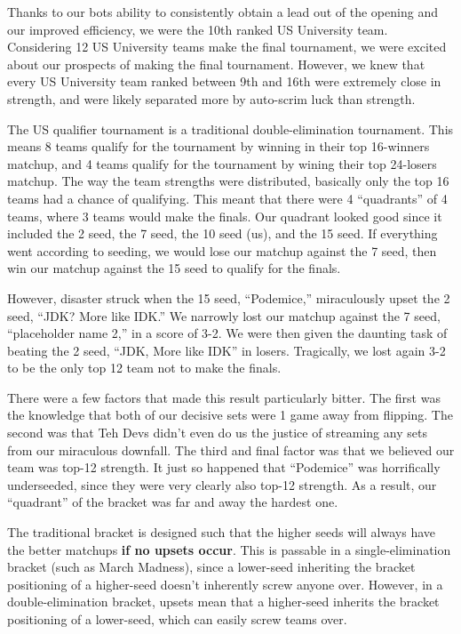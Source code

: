 Thanks to our bots ability to consistently obtain a lead out of the opening and our improved efficiency, we were the 10th ranked US University team. Considering 12 US University teams make the final tournament, we were excited about our prospects of making the final tournament. However, we knew that every US University team ranked between 9th and 16th were extremely close in strength, and were likely separated more by auto-scrim luck than strength.

\medskip

The US qualifier tournament is a traditional double-elimination tournament. This means 8 teams qualify for the tournament by winning in their top 16-winners matchup, and 4 teams qualify for the tournament by wining their top 24-losers matchup. The way the team strengths were distributed, basically only the top 16 teams had a chance of qualifying. This meant that there were 4 ``quadrants'' of 4 teams, where 3 teams would make the finals. Our quadrant looked good since it included the 2 seed, the 7 seed, the 10 seed (us), and the 15 seed. If everything went according to seeding, we would lose our matchup against the 7 seed, then win our matchup against the 15 seed to qualify for the finals.

\medskip

However, disaster struck when the 15 seed, ``Podemice,'' miraculously upset the 2 seed, ``JDK? More like IDK.'' We narrowly lost our matchup against the 7 seed, ``placeholder name 2,'' in a score of 3-2. We were then given the daunting task of beating the 2 seed, ``JDK, More like IDK'' in losers. Tragically, we lost again 3-2 to be the only top 12 team not to make the finals.

\medskip

There were a few factors that made this result particularly bitter. The first was the knowledge that both of our decisive sets were 1 game away from flipping. The second was that Teh Devs didn't even do us the justice of streaming any sets from our miraculous downfall. The third and final factor was that we believed our team was top-12 strength. It just so happened that ``Podemice'' was horrifically underseeded, since they were very clearly also top-12 strength. As a result, our ``quadrant'' of the bracket was far and away the hardest one.

\medskip

The traditional bracket is designed such that the higher seeds will always have the better matchups \textbf{if no upsets occur}. This is passable in a single-elimination bracket (such as March Madness), since a lower-seed inheriting the bracket positioning of a higher-seed doesn't inherently screw anyone over. However, in a double-elimination bracket, upsets mean that a higher-seed inherits the bracket positioning of a lower-seed, which can easily screw teams over.

